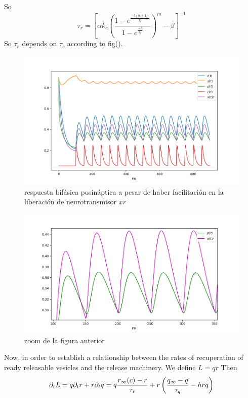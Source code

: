 So 
\begin{equation}
    \tau_r = \left[ \alpha k_c \left(\frac{1-e^{\frac{-\delta(n+1)}{\tau_c}}}{1-e^{\frac{-\delta}{\tau_c}}}\right)^m - \beta \right]^{-1} 
\end{equation}
So $\tau_r$ depends on $\tau_c$ according to fig().

\begin{figure}
    \centering
    \includegraphics[scale = 0.6]{FacPre_bifPos.png}
    \caption{respuesta bifásica posináptica a pesar de haber facilitación en la liberación de neurotransmisor $xr$}
    \label{fig:my_label}
\end{figure}

\begin{figure}
    \centering
    \includegraphics[scale = 0.6]{zoom2.png}
    \caption{zoom de la figura anterior}
    \label{fig:my_label}
\end{figure}

Now, in order to establish a relationship between the rates of recuperation of ready releasable vesicles and the release machinery. We define $L = qr$
Then 
\begin{equation}
    \partial_t L = q \partial_t r + r \partial_t q \\ 
    = q \frac{r_{\infty}(c) - r}{\tau_r} + r \left(\frac{q_{\infty}-q}{\tau_q} - h r q\right)
\end{equation}

